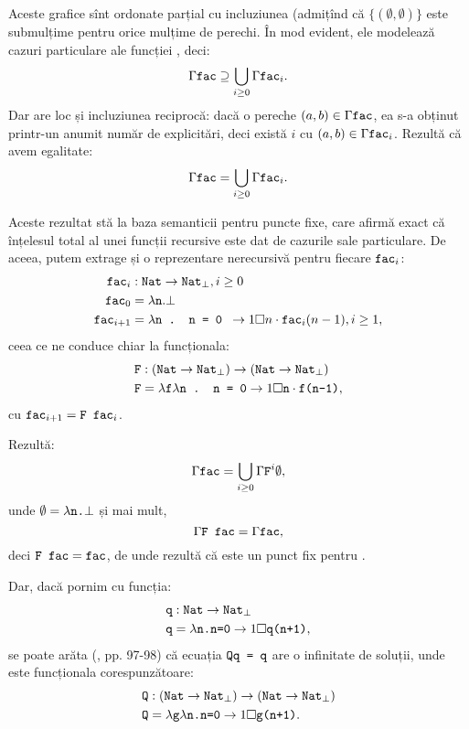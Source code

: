 Aceste grafice sînt ordonate parțial cu incluziunea (admițînd că $ \{ (\emptyset, \emptyset) \} $
este submulțime pentru orice mulțime de perechi. În mod evident, ele modelează cazuri
particulare ale funcției , deci:
\[
  \Gamma \texttt{fac} \supseteq \bigcup_{i \geq 0} \Gamma \texttt{fac}_i.
\]
Dar are loc și incluziunea reciprocă: dacă o pereche $ (a, b) \in \Gamma \texttt{fac} $, ea
s-a obținut printr-un anumit număr de explicitări, deci există $ i $ cu $ (a, b) \in \Gamma \texttt{fac}_i $.
Rezultă că avem egalitate:
\[
  \Gamma \texttt{fac} = \bigcup_{i \geq 0} \Gamma \texttt{fac}_i.
\]

Aceste rezultat stă la baza semanticii pentru puncte fixe, care afirmă exact că
înțelesul total al unei funcții recursive este dat de cazurile sale particulare.
De aceea, putem extrage și o reprezentare nerecursivă pentru fiecare $\texttt{fac}_i $:
\begin{align*}
  \texttt{fac}_i &: \texttt{Nat} \to \texttt{Nat}_\bot, i \geq 0 \\
  \texttt{fac}_0 &= \lambda \texttt{n} . \bot \\
  \texttt{fac}_{i + 1} &= \lambda \texttt{n . n = 0 } \to 1 \square n \cdot \texttt{fac}_i(n-1), i \geq 1,
\end{align*}
ceea ce ne conduce chiar la funcționala:
\begin{align*}
  \texttt{F} &: (\texttt{Nat} \to \texttt{Nat}_\bot) \to (\texttt{Nat} \to \texttt{Nat}_\bot) \\
  \texttt{F} &= \lambda \texttt{f}\lambda \texttt{n . n = 0} \to 1 \square \texttt{n} \cdot \texttt{f(n-1)},
\end{align*}
cu $ \texttt{fac}_{i + 1} = \texttt{F fac}_i $.

Rezultă:
\[
  \Gamma \texttt{fac} = \displaystyle\bigcup_{i \geq 0} \Gamma \texttt{F}^i \emptyset,
\]
unde $ \emptyset = \lambda \texttt{n.} \bot $ și mai mult,
\[
  \Gamma \texttt{F fac} = \Gamma \texttt{fac},
\]
deci $ \texttt{F fac} = \texttt{fac} $, de unde rezultă că  este un punct
fix pentru .

Dar, dacă pornim cu funcția:
\begin{align*}
  \texttt{q} &: \texttt{Nat} \to \texttt{Nat}_\bot \\
  \texttt{q} &= \lambda \texttt{n.n=0} \to 1 \square \texttt{q(n+1)},
\end{align*}
se poate arăta (\cite{schm}, pp. 97-98) că ecuația $ \texttt{Qq = q} $ are
o infinitate de soluții, unde  este funcționala corespunzătoare:
\begin{align*}
  \texttt{Q} &: (\texttt{Nat} \to \texttt{Nat}_\bot) \to (\texttt{Nat} \to \texttt{Nat}_\bot) \\
  \texttt{Q} &= \lambda \texttt{g} \lambda \texttt{n.n=0} \to 1 \square \texttt{g(n+1)}.
\end{align*}

